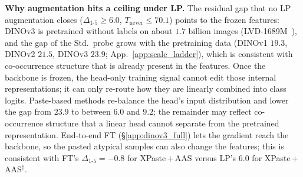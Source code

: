 \begin{table}[!htp]%
\centering
\footnotesize
\setlength{\tabcolsep}{4pt}
\caption{\textbf{DINOv3 ViT-B/16 linear probe: typicality bias under
augmentation.} With the backbone frozen, XPaste\,+\,AAS$^{\dagger}$ \emph{(ours)} has the smallest STRANGE-Bench gap ($6.0$ against $23.9$ for Std.), the highest atypical mean and the highest $T_{\text{never}}$ ($70.1$), while Std.\ keeps the highest COCO F1$^{\text{val}}$ and SCP has the smallest COCO gap ($5.7$). F1$_{\text{micro}}$ (\%) on COCO val, the COCO quintile paired split and STRANGE-Bench; one training draw per row. $^{\dagger}$AAS sampling ($\beta = 3.5$) over the whole linear-probe schedule, without the late stage on generated scenes and the weight averaging of Sec.~\ref{sec:aas}. Best per column in \textbf{bold}, second-best \underline{underlined}.}
\label{tab:dinov3_lp_main}

\end{table}

\noindent\textbf{Why augmentation hits a ceiling under LP.}
The residual gap that no LP augmentation closes ($\Delta_{1\text{-}5} \geq 6.0$, $T_{\text{never}} \leq 70.1$) points to the frozen features: DINOv3 is pretrained without labels on about $1.7$ billion images (LVD-1689M~\cite{simeoni2025dinov3}), and the gap of the Std.\ probe grows with the pretraining data (DINOv1 $19.3$, DINOv2 $21.5$, DINOv3 $23.9$; App.~\ref{app:scale_ladder}), which is consistent with co-occurrence structure that is already present in the features. Once the backbone is frozen, the head-only training signal cannot edit those internal representations; it can only re-route how they are linearly combined into class logits. Paste-based methods re-balance the head's input distribution and lower the gap from $23.9$ to between $6.0$ and $9.2$; the remainder may reflect co-occurrence structure that a linear head cannot separate from the pretrained representation. End-to-end FT (\S\ref{app:dinov3_full}) lets the gradient reach the backbone, so the pasted atypical samples can also change the features; this is consistent with FT's $\Delta_{1\text{-}5} = -0.8$ for XPaste\,+\,AAS versus LP's $6.0$ for XPaste\,+\,AAS$^{\dagger}$.

